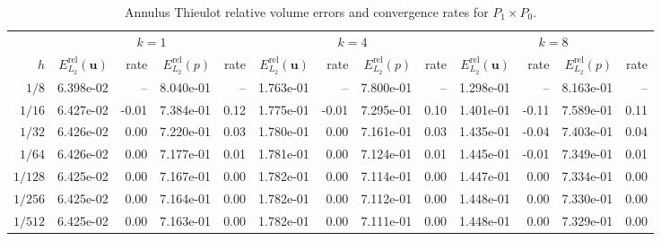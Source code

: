 \documentclass[10pt,a4paper]{article}
\begin{document}
\begin{table}[p]
\centering
\caption{Annulus Thieulot relative volume errors and convergence rates for $P_1\times P_0$.}
\label{tab:annulus_thieulot_v1_p0_disc}
\small
\begin{tabular}{
r rr rr rr rr rr rr
}
\toprule
& \multicolumn{4}{c}{$k=1$} & \multicolumn{4}{c}{$k=4$} & \multicolumn{4}{c}{$k=8$} \\
\cmidrule(lr){2-5}\cmidrule(lr){6-9}\cmidrule(lr){10-13}
$h$ & $E_{L_2}^{\mathrm{rel}}(\mathbf{u})$ & rate & $E_{L_2}^{\mathrm{rel}}(p)$ & rate & $E_{L_2}^{\mathrm{rel}}(\mathbf{u})$ & rate & $E_{L_2}^{\mathrm{rel}}(p)$ & rate & $E_{L_2}^{\mathrm{rel}}(\mathbf{u})$ & rate & $E_{L_2}^{\mathrm{rel}}(p)$ & rate \\
\midrule
$1/8$ & 6.398e-02 & -- & 8.040e-01 & -- & 1.763e-01 & -- & 7.800e-01 & -- & 1.298e-01 & -- & 8.163e-01 & -- \\
$1/16$ & 6.427e-02 & -0.01 & 7.384e-01 & 0.12 & 1.775e-01 & -0.01 & 7.295e-01 & 0.10 & 1.401e-01 & -0.11 & 7.589e-01 & 0.11 \\
$1/32$ & 6.426e-02 & 0.00 & 7.220e-01 & 0.03 & 1.780e-01 & 0.00 & 7.161e-01 & 0.03 & 1.435e-01 & -0.04 & 7.403e-01 & 0.04 \\
$1/64$ & 6.426e-02 & 0.00 & 7.177e-01 & 0.01 & 1.781e-01 & 0.00 & 7.124e-01 & 0.01 & 1.445e-01 & -0.01 & 7.349e-01 & 0.01 \\
$1/128$ & 6.425e-02 & 0.00 & 7.167e-01 & 0.00 & 1.782e-01 & 0.00 & 7.114e-01 & 0.00 & 1.447e-01 & 0.00 & 7.334e-01 & 0.00 \\
$1/256$ & 6.425e-02 & 0.00 & 7.164e-01 & 0.00 & 1.782e-01 & 0.00 & 7.112e-01 & 0.00 & 1.448e-01 & 0.00 & 7.330e-01 & 0.00 \\
$1/512$ & 6.425e-02 & 0.00 & 7.163e-01 & 0.00 & 1.782e-01 & 0.00 & 7.111e-01 & 0.00 & 1.448e-01 & 0.00 & 7.329e-01 & 0.00 \\
\bottomrule
\end{tabular}
\end{table}
\end{document}
